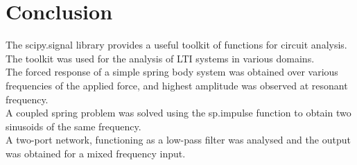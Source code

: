 \documentclass[11pt, a4paper]{article}
\begin{document}
\section{Conclusion}
    The scipy.signal library provides a useful toolkit of functions for circuit analysis. The toolkit was used for the analysis of LTI systems in various domains.\\
    The forced response of a simple spring body system was obtained over various frequencies of the applied force, and highest amplitude was observed at resonant frequency.\\
    A coupled spring problem was solved using the sp.impulse function to obtain two sinusoids of the same frequency.\\
    A two-port network, functioning as a low-pass filter was analysed and the output was obtained for a mixed frequency input.
\end{document}
